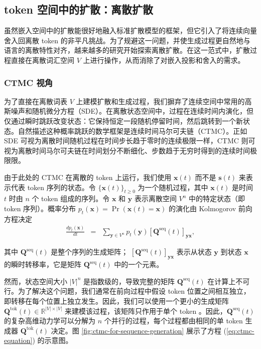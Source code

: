 \documentclass[UTF8,a4paper,zihao=-4,oneside,openany]{ctexbook}
\begin{document}
\subsection{ token 空间中的扩散：离散扩散}

虽然嵌入空间中的扩散能很好地融入标准扩散模型的框架，但它引入了将连续向量舍入回离散 token 的非平凡挑战。为了规避这一问题，并使生成过程更自然地与语言的离散特性对齐，越来越多的研究开始探索离散扩散。在这一范式中，扩散过程直接在离散词汇空间 $V$ 上进行操作，从而消除了对嵌入投影和舍入的需求。
\subsubsection{CTMC 视角}
\label{sec:the-ctmc-perspective}

为了直接在离散词表 $V$ 上建模扩散和生成过程，我们摒弃了连续空间中常用的高斯噪声和随机微分方程（SDE）。在离散状态空间中，过程在连续时间内演化，但仅通过瞬时跳跃改变状态：它保持恒定一段随机停留时间，然后跳转到一个新状态。自然描述这种概率跳跃的数学框架是连续时间马尔可夫链（CTMC）。正如 SDE 可视为离散时间随机过程在时间步长趋于零时的连续极限一样，CTMC 则可视为离散时间马尔可夫链在时间划分不断细化、步数趋于无穷时得到的连续时间极限限。

由于此处的 CTMC 在离散的 token 上运行，我们使用 $\mathbf{x}(t)$ 而不是 $\mathbf{s}(t)$ 来表示代表 token 序列的状态。令 $\{\mathbf{x}(t)\}_{t \ge 0}$ 为一个随机过程，其中 $\mathbf{x}(t)$ 是时间 $t$ 时由 $n$ 个 token 组成的序列。令 $\mathbf{x}$ 和 $\mathbf{y}$ 表示离散空间 $V^n$ 中的特定状态（即 token 序列）。概率分布 $p_t(\mathbf{x}) = \Pr(\mathbf{x}(t)=\mathbf{x})$ 的演化由 Kolmogorov 前向方程决定
\begin{eqnarray}
\frac{d p_t(\mathbf{x})}{dt} & = & \sum_{\mathbf{y} \in V^n} p_t(\mathbf{y}) [\mathbf{Q}^{\mathrm{seq}}(t)]_{\mathbf{y}\mathbf{x}}, \label{eq:ctmc-equation}
\end{eqnarray}

\noindent 其中 $\mathbf{Q}^{\mathrm{seq}}(t)$ 是整个序列的生成矩阵； $[\mathbf{Q}^{\mathrm{seq}}(t)]_{\mathbf{y}\mathbf{x}}$ 表示从状态 $\mathbf{y}$ 到状态 $\mathbf{x}$ 的瞬时转移率，它是矩阵 $\mathbf{Q}^{\mathrm{seq}}(t)$ 中的一个元素。

然而，状态空间大小 $|V|^n$ 是指数级的，导致完整的矩阵 $\mathbf{Q}^{\mathrm{seq}}(t)$ 在计算上不可行。为了解决这个问题，我们通常在前向过程中假设 token 位置之间相互独立，即转移在每个位置上独立发生。因此，我们可以使用一个更小的生成矩阵 $\mathbf{Q}^{\mathrm{tok}}(t) \in \mathbb{R}^{|V| \times |V|}$ 来建模该过程，该矩阵只作用于单个 token 。因此，$\mathbf{Q}^{\mathrm{seq}}(t)$ 的复杂高维动力学可以分解为 $n$ 个并行的过程，每个过程都由相同的单 token 生成器 $\mathbf{Q}^{\mathrm{tok}}(t)$ 决定。图 \ref{fig:ctmc-for-sequence-generation} 展示了方程 (\ref{eq:ctmc-equation}) 的示意图。
\end{document}
